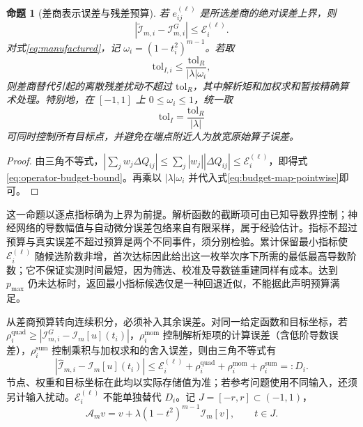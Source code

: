 \documentclass[UTF8,fontset=none,10.5pt,a4paper]{ctexart}
\numberwithin{equation}{section}
\newtheorem{proposition}{命题}
\begin{document}
\begin{proposition}[差商表示误差与残差预算]
若 $e_{ij}^{(\ell)}$ 是所选差商的绝对误差上界，则
\begin{equation}
|\widetilde{\mathcal I}_{m,i}-\mathcal I^G_{m,i}|
\le \mathcal E_i^{(\ell)}.
\label{eq:operator-budget-bound}
\end{equation}
对式\eqref{eq:manufactured}，记 $\omega_i=(1-t_i^2)^{m-1}$。若取
\begin{equation}
\mathrm{tol}_{I,i}
\le \frac{\mathrm{tol}_R}{|\lambda|\omega_i},
\label{eq:budget-map-pointwise}
\end{equation}
则差商替代引起的离散残差扰动不超过 $\mathrm{tol}_R$，其中解析矩和加权求和暂按精确算术处理。特别地，在 $[-1,1]$ 上 $0\le\omega_i\le1$，统一取
\begin{equation}
\mathrm{tol}_I=\frac{\mathrm{tol}_R}{|\lambda|}
\label{eq:budget-map-global}
\end{equation}
可同时控制所有目标点，并避免在端点附近人为放宽原始算子误差。
\end{proposition}
\begin{proof}
由三角不等式，$|\sum_jw_j\Delta Q_{ij}|\le\sum_j|w_j||\Delta Q_{ij}|\le\mathcal E_i^{(\ell)}$，即得式\eqref{eq:operator-budget-bound}。再乘以 $|\lambda|\omega_i$ 并代入式\eqref{eq:budget-map-pointwise}即可。
\end{proof}

这一命题以逐点指标确为上界为前提。解析函数的截断项可由已知导数界控制；神经网络的导数幅值与自动微分误差包络来自有限采样，属于经验估计。指标不超过预算与真实误差不超过预算是两个不同事件，须分别检验。累计保留最小指标使 $\mathcal E_i^{(\ell)}$ 随候选阶数非增，首次达标因此给出这一枚举次序下所需的最低最高导数阶数；它不保证实测时间最短，因为筛选、校准及导数链重建同样有成本。达到 $p_{\max}$ 仍未达标时，返回最小指标候选仅是一种回退近似，不能据此声明预算满足。

从差商预算转向连续积分，必须补入其余误差。对同一给定函数和目标坐标，若 $\rho_i^{\mathrm{quad}}\ge|\mathcal I^G_{m,i}-\mathcal I_m[u](t_i)|$，$\rho_i^{\mathrm{mom}}$ 控制解析矩项的计算误差（含低阶导数误差），$\rho_i^{\mathrm{sum}}$ 控制乘积与加权求和的舍入误差，则由三角不等式有
\begin{equation}
|\widehat{\mathcal I}_{m,i}-\mathcal I_m[u](t_i)|
\le \mathcal E_i^{(\ell)}+\rho_i^{\mathrm{quad}}
+\rho_i^{\mathrm{mom}}+\rho_i^{\mathrm{sum}}
=:D_i.
\label{eq:complete-operator-error}
\end{equation}
节点、权重和目标坐标在此均以实际存储值为准；若参考问题使用不同输入，还须另计输入扰动。$\mathcal E_i^{(\ell)}$ 不能单独替代 $D_i$。记 $J=[-r,r]\subset(-1,1)$，
\begin{equation}
\mathcal A_m v
=v+\lambda(1-t^2)^{m-1}\mathcal I_m[v],
\qquad t\in J.
\label{eq:linear-operator}
\end{equation}
\end{document}
